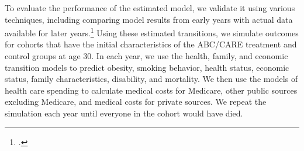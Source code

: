 \noindent To evaluate the performance of the estimated model, we validate it using various techniques, including comparing model results from early years with actual data available for later years.\footnote{\citet{Goldman_etal_2015_Future-America-Model}.} Using these estimated transitions, we simulate outcomes for cohorts that have the initial characteristics of the ABC/CARE treatment and control groups at age 30. In each year, we use the health, family, and economic transition models to predict obesity, smoking behavior, health status, economic status, family characteristics, disability, and mortality. We then use the models of health care spending to calculate medical costs for Medicare, other public sources excluding Medicare, and medical costs for private sources. We repeat the simulation each year until everyone in the cohort would have died. \\
